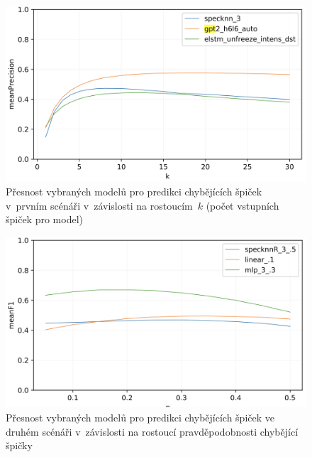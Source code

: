 \documentclass[a4paper,11pt]{article}
\begin{document}
\begin{figure}
\begin{center}
\includegraphics[width=.8\hsize]{result-missing}
\end{center}
\caption{Přesnost vybraných modelů pro predikci chybějících špiček v~prvním scénáři v~závislosti na rostoucím~$k$
(počet vstupních špiček pro model)
}
\label{f:result-missing}
\end{figure}

\begin{figure}
\begin{center}
\includegraphics[width=.8\hsize]{result-wrong}
\end{center}
\caption{Přesnost vybraných modelů pro predikci chybějících špiček ve druhém scénáři v~závislosti na rostoucí
pravděpodobnosti chybějící špičky}
\label{f:result-wrong}
\end{figure}
\end{document}
